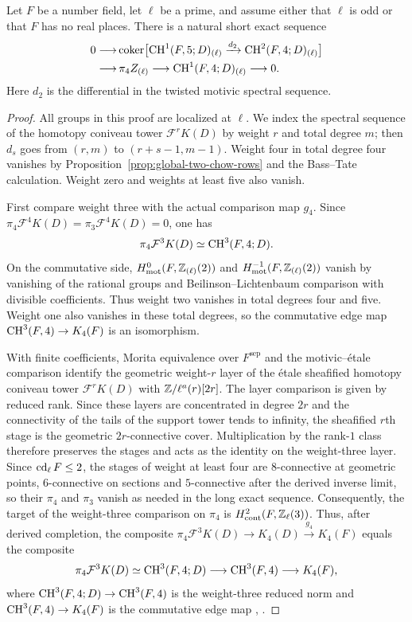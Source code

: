 \begin{proposition}\label{prop:global-fibre-pi4}
Let $F$ be a number field, let $\ell$ be a prime, and assume either that $\ell$ is odd or that $F$ has no real places.
There is a natural short exact sequence
\[
\begin{split}
 0\longrightarrow&
 \operatorname{coker}\bigl[\operatorname{CH}^1(F,5;D)_{(\ell)}
      \xrightarrow{d_2}\operatorname{CH}^2(F,4;D)_{(\ell)}\bigr]\\
 \longrightarrow&\,\pi_4Z_{(\ell)}
 \longrightarrow\operatorname{CH}^1(F,4;D)_{(\ell)}
 \longrightarrow 0.
\end{split}
\]
Here $d_2$ is the differential in the twisted motivic spectral sequence.
\end{proposition}
\begin{proof}
All groups in this proof are localized at $\ell$.
We index the spectral sequence of the homotopy coniveau tower $\mathcal{F}^rK(D)$ by weight $r$ and total degree $m$; then $d_s$ goes from $(r,m)$ to $(r+s-1,m-1)$.
Weight four in total degree four vanishes by Proposition~\ref{prop:global-two-chow-rows} and the Bass--Tate calculation.
Weight zero and weights at least five also vanish.

First compare weight three with the actual comparison map $g_4$.
Since $\pi_4\mathcal{F}^4K(D)=\pi_3\mathcal{F}^4K(D)=0$, one has
\[
 \pi_4 \mathcal{F}^3K(D)\simeq\operatorname{CH}^3(F,4;D).
\]
On the commutative side, $H^0_{\mathrm{mot}}(F,\mathbb Z_{(\ell)}(2))$ and $H^{-1}_{\mathrm{mot}}(F,\mathbb Z_{(\ell)}(2))$ vanish by vanishing of the rational groups and Beilinson--Lichtenbaum comparison with divisible coefficients.
Thus weight two vanishes in total degrees four and five.
Weight one also vanishes in these total degrees, so the commutative edge map $\operatorname{CH}^3(F,4)\to K_4(F)$ is an isomorphism.

With finite coefficients, Morita equivalence over $F^{\mathrm{sep}}$ and the motivic--\'etale comparison identify the geometric weight-$r$ layer of the \'etale sheafified homotopy coniveau tower $\mathcal{F}^rK(D)$ with $\mathbb Z/\ell^a(r)[2r]$.
The layer comparison is given by reduced rank.
Since these layers are concentrated in degree $2r$ and the connectivity of the tails of the support tower tends to infinity, the sheafified $r$th stage is the geometric $2r$-connective cover.
Multiplication by the rank-$1$ class therefore preserves the stages and acts as the identity on the weight-three layer.
Since $\operatorname{cd}_\ell F\le2$, the stages of weight at least four are $8$-connective at geometric points, $6$-connective on sections and $5$-connective after the derived inverse limit, so their $\pi_4$ and $\pi_3$ vanish as needed in the long exact sequence.
Consequently, the target of the weight-three comparison on $\pi_4$ is $H^2_{\mathrm{cont}}(F,\mathbb Z_\ell(3))$.
Thus, after derived completion, the composite $\pi_4\mathcal{F}^3K(D)\to K_4(D)\xrightarrow{g_4}K_4(F)$ equals the composite
\[
 \pi_4\mathcal{F}^3K(D)\simeq\operatorname{CH}^3(F,4;D)\longrightarrow\operatorname{CH}^3(F,4)\longrightarrow K_4(F),
\]
where $\operatorname{CH}^3(F,4;D)\to\operatorname{CH}^3(F,4)$ is the weight-three reduced norm and $\operatorname{CH}^3(F,4)\to K_4(F)$ is the commutative edge map \cite[\S6.9]{KahnLevine2010}, \cite{ClausenMathew}.


\end{proof}
